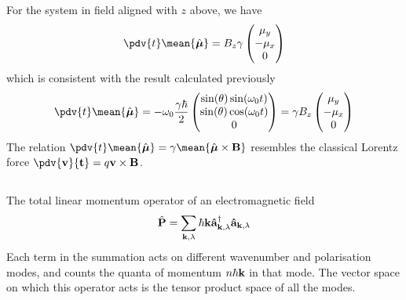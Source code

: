 \documentclass[12pt]{article}
\begin{document}
        For the system in field aligned with \(z\) above, we have \[
            \pdv{t} \mean{\hat{\boldsymbol \mu}} = B_z\gamma \begin{pmatrix} \mu_y\\ - \mu_x\\0 \end{pmatrix} 
        \]
        which is consistent with the result calculated previously \begin{align*}
            \pdv{t} \mean{\hat{\boldsymbol \mu}} = - \omega_0 \frac{\gamma\hbar}{2} \begin{pmatrix}
                \sin(\theta)\sin(\omega_0t)\\
                \sin(\theta)\cos(\omega_0t)\\
                0
            \end{pmatrix} = \gamma B_z \begin{pmatrix} \mu_y \\ -\mu_x\\0 \end{pmatrix} 
        \end{align*}
        The relation \(\pdv{t} \mean{\hat{\boldsymbol \mu}} = \gamma \mean{\hat{\boldsymbol \mu} \times \bf B}\) resembles the classical Lorentz force \(\pdv{\bf v}{t} = q\bf v \times \bf B\).
        \subsection{} The total linear momentum operator of an electromagnetic field \[
            \hat{\bf P} =\sum_{\bf k, \lambda} \hbar \bf k \hat{a}^\dagger_{\bf k,\lambda} \hat{a}_{\bf k,\lambda}
        \]
        Each term in the summation acts on different wavenumber and polarisation modes, and counts the quanta of momentum \(n\hbar \bf k\) in that mode. The vector space on which this operator acts is the tensor product space of all the modes. 
\end{document}
